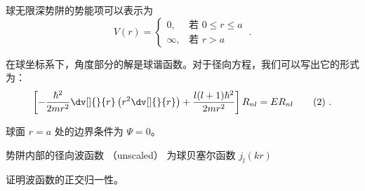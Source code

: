 
\begin{issues}
\issueDraft
\end{issues}


球无限深势阱的势能项可以表示为
$$
V(r)=
\begin{cases}
0,  & \text{若 $0\leq r\leq a$} \\
\infty, & \text{若 $r>a$}
\end{cases}~.
$$


在球坐标系下，角度部分的解是球谐函数。对于径向方程，我们可以写出它的形式为：
\begin{equation}
\left[-\frac{\hbar^2}{2mr^2} \dv[]{}{r}\left(r^2\dv[]{}{r}\right) + \frac{l(l + 1)\hbar^2}{2mr^2}\right]R_{nl} = ER_{nl}\tag{2}
~.\end{equation}

球面 $r = a$ 处的边界条件为 $\Psi = 0$。

势阱内部的径向波函数 （unscaled） 为球贝塞尔函数 $j_l(kr)$

证明波函数的正交归一性。
